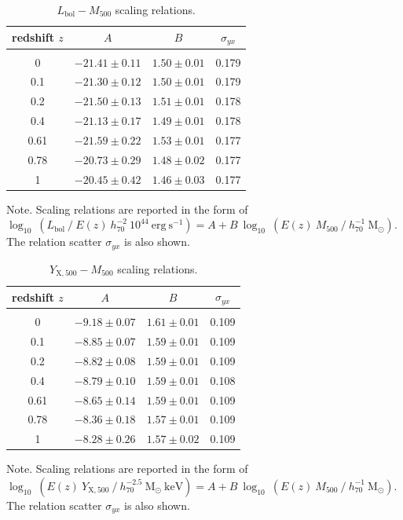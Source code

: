 \documentclass[traditabstract]{aa}
\newcommand{\rmn}{\mathrm}
\begin{document}
\begin{table}[t]
\begin{center}
\caption{$L_{\rmn{bol}}-M_{500}$ scaling relations.}
\medskip
\begin{tabular}{cccc}
\hline\hline
\phantom{\Big|}
redshift $z$ & $A$ & $B$ & $\sigma_{yx}$ \\
\hline \\[-0.5em]
 0      & $-21.41\pm0.11$ & $1.50\pm0.01$ & 0.179\\
 0.1   & $-21.30\pm0.12$ & $1.50\pm0.01$ & 0.179\\
 0.2   & $-21.50\pm0.13$ & $1.51\pm0.01$ & 0.178\\ 
 0.4   & $-21.13\pm0.17$ & $1.49\pm0.01$ & 0.178\\ 
 0.61 & $-21.59\pm0.22$ & $1.53\pm0.01$ & 0.177\\ 
 0.78 & $-20.73\pm0.29$ & $1.48\pm0.02$ & 0.177\\ 
 1      & $-20.45\pm0.42$ & $1.46\pm0.03$ & 0.177\\[0.5em]
\hline
\end{tabular}
\label{tab:LMfits}
\end{center}
\footnotesize{Note. Scaling relations are reported in the form of $\log_{10}~(L_{\rmn{bol}}~/~E(z)~h_{70}^{-2}~10^{44}~\rmn{erg~s}^{-1})=A+B~\log_{10}~(E(z)~M_{500}~/~h_{70}^{-1}~\rmn{M_{\odot}})$. The relation scatter $\sigma_{yx}$ is also shown.}
\end{table}
 
\begin{table}[t]
\begin{center}
\caption{$Y_{\rmn{X}, 500}-M_{500}$ scaling relations.}
\medskip
\begin{tabular}{cccc}
\hline\hline
\phantom{\Big|}
redshift $z$ & $A$ & $B$ & $\sigma_{yx}$ \\
\hline\\[-0.5em]
 0      & $-9.18\pm0.07$ & $1.61\pm0.01$ & 0.109\\
 0.1   & $-8.85\pm0.07$ & $1.59\pm0.01$ & 0.109\\
 0.2   & $-8.82\pm0.08$ & $1.59\pm0.01$ & 0.109\\ 
 0.4   & $-8.79\pm0.10$ & $1.59\pm0.01$ & 0.108\\ 
 0.61 & $-8.65\pm0.14$ & $1.59\pm0.01$ & 0.109\\ 
 0.78 & $-8.36\pm0.18$ & $1.57\pm0.01$ & 0.109\\ 
 1      & $-8.28\pm0.26$ & $1.57\pm0.02$ & 0.109\\[0.5em]  
\hline
\end{tabular}
\label{tab:YXfits}
\end{center}
\footnotesize{Note. Scaling relations are reported in the form of $\log_{10}~(E(z)~Y_{\rmn{X},500}~/~h_{70}^{-2.5}~\rmn{M_{\odot}}~\rmn{keV})=A+B~\log_{10}~(E(z)~M_{500}~/~h_{70}^{-1}~\rmn{M_{\odot}})$. The relation scatter $\sigma_{yx}$ is also shown.}
\end{table}
\end{document}
